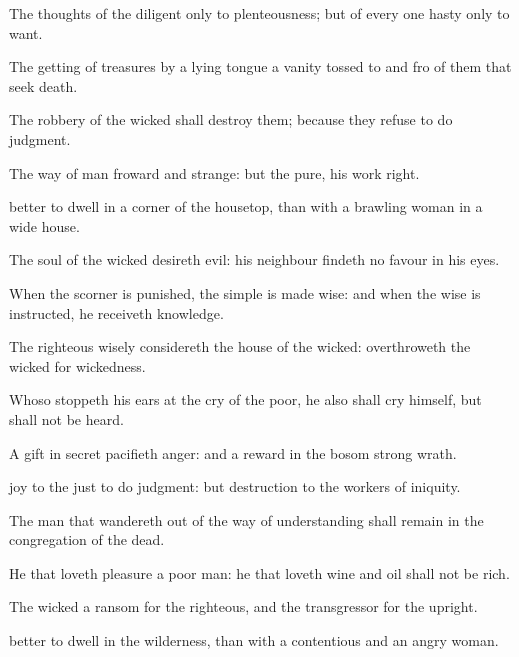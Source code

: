 {The
thoughts of the
diligent
{} only to
plenteousness; but of every one
{}
hasty only to
want.

The
getting of
treasures by a
lying
tongue
{} a
vanity tossed to and fro
of them that
seek
death.

The
robbery of the
wicked shall
destroy them; because they
refuse to
do
judgment.

The
way of
man
{}
froward and
strange: but
{} the
pure, his
work
{}
right.

better to
dwell in a
corner of the
housetop, than with a
brawling
woman in a
wide
house.

The
soul of the
wicked
desireth
evil: his
neighbour findeth no
favour in his
eyes.

When the
scorner is
punished, the
simple is made
wise: and when the
wise is
instructed, he
receiveth
knowledge.

The
righteous
{} wisely
considereth the
house of the
wicked:
{}
overthroweth the
wicked for
{}
wickedness.

Whoso
stoppeth his
ears at the
cry of the
poor, he also shall
cry himself, but shall not be
heard.

A
gift in
secret
pacifieth
anger: and a
reward in the
bosom
strong
wrath.

joy to the
just to
do
judgment: but
destruction
{} to the
workers of
iniquity.

The
man that
wandereth out of the
way of
understanding shall
remain in the
congregation of the
dead.

He that
loveth
pleasure
{} a
poor
man: he that
loveth
wine and
oil shall not be
rich.

The
wicked
{} a
ransom for the
righteous, and the
transgressor for the
upright.

better to
dwell in the
wilderness, than with a
contentious and an
angry
woman.

}
